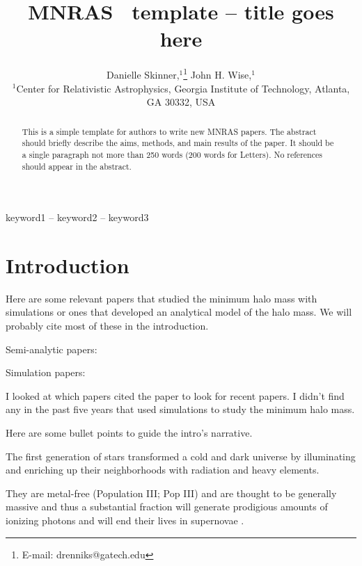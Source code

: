 \documentclass[a4paper,fleqn,usenatbib]{mnras}
\title[Short title, max. 45 characters]{MNRAS \LaTeXe\ template -- title goes here}
\author[Danielle Skinner et al.]{
Danielle Skinner,$^{1}$\thanks{E-mail: drenniks@gatech.edu}
John H. Wise,$^{1}$
\\
$^{1}$Center for Relativistic Astrophysics, Georgia Institute of Technology, Atlanta, GA 30332, USA\\
}
\begin{document}
\label{firstpage}
\pagerange{\pageref{firstpage}--\pageref{lastpage}}
\maketitle

\begin{abstract}
This is a simple template for authors to write new MNRAS papers.
The abstract should briefly describe the aims, methods, and main results of the paper.
It should be a single paragraph not more than 250 words (200 words for Letters).
No references should appear in the abstract.
\end{abstract}

\begin{keywords}
keyword1 -- keyword2 -- keyword3
\end{keywords}



\section{Introduction}

\noindent Here are some relevant papers that studied the minimum halo
mass with simulations or ones that developed an analytical model of
the halo mass.  We will probably cite most of these in the
introduction.

\lli Semi-analytic papers: \citep{Tegmark97, Trenti09, Visbal18,
  Mebane18, Griffen18}

\lli Simulation papers: \citep{Machacek01, Yoshida03, Wise07_UVB,
  OShea08, Muratov13}

 I looked at which papers cited the \citet{Machacek01}
paper to look for recent papers.  I didn't find any in the past five
years that used simulations to study the minimum halo mass.

\medskip
\noindent Here are some bullet points to guide the intro's narrative.

\li The first generation of stars transformed a cold and dark universe
by illuminating and enriching up their neighborhoods with radiation
and heavy elements.

\li They are metal-free (Population III; Pop III) and are thought to
be generally massive and thus a substantial fraction will generate
prodigious amounts of ionizing photons and will end their lives in
supernovae \citep[e.g.][]{Schaerer02, Heger02}.
\end{document}
